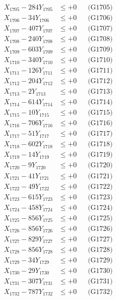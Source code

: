 \documentclass[a4paper,10pt]{article}
\begin{document}
{\begin{align}
X_{1705} - 284Y_{1705} &\leq +0 && \text{(G1705)} \\
X_{1706} - 34Y_{1706} &\leq +0 && \text{(G1706)} \\
X_{1707} - 407Y_{1707} &\leq +0 && \text{(G1707)} \\
X_{1708} - 240Y_{1708} &\leq +0 && \text{(G1708)} \\
X_{1709} - 603Y_{1709} &\leq +0 && \text{(G1709)} \\
X_{1710} - 340Y_{1710} &\leq +0 && \text{(G1710)} \\
\allowbreak
X_{1711} - 126Y_{1711} &\leq +0 && \text{(G1711)} \\
X_{1712} - 204Y_{1712} &\leq +0 && \text{(G1712)} \\
X_{1713} - 2Y_{1713} &\leq +0 && \text{(G1713)} \\
X_{1714} - 614Y_{1714} &\leq +0 && \text{(G1714)} \\
X_{1715} - 10Y_{1715} &\leq +0 && \text{(G1715)} \\
X_{1716} - 706Y_{1716} &\leq +0 && \text{(G1716)} \\
X_{1717} - 51Y_{1717} &\leq +0 && \text{(G1717)} \\
X_{1718} - 602Y_{1718} &\leq +0 && \text{(G1718)} \\
X_{1719} - 14Y_{1719} &\leq +0 && \text{(G1719)} \\
X_{1720} - 9Y_{1720} &\leq +0 && \text{(G1720)} \\
\allowbreak
X_{1721} - 41Y_{1721} &\leq +0 && \text{(G1721)} \\
X_{1722} - 49Y_{1722} &\leq +0 && \text{(G1722)} \\
X_{1723} - 615Y_{1723} &\leq +0 && \text{(G1723)} \\
X_{1724} - 458Y_{1724} &\leq +0 && \text{(G1724)} \\
X_{1725} - 856Y_{1725} &\leq +0 && \text{(G1725)} \\
X_{1726} - 856Y_{1726} &\leq +0 && \text{(G1726)} \\
X_{1727} - 829Y_{1727} &\leq +0 && \text{(G1727)} \\
X_{1728} - 856Y_{1728} &\leq +0 && \text{(G1728)} \\
X_{1729} - 34Y_{1729} &\leq +0 && \text{(G1729)} \\
X_{1730} - 29Y_{1730} &\leq +0 && \text{(G1730)} \\
\allowbreak
X_{1731} - 307Y_{1731} &\leq +0 && \text{(G1731)} \\
X_{1732} - 787Y_{1732} &\leq +0 && \text{(G1732)} \\

\end{align}}
\end{document}
